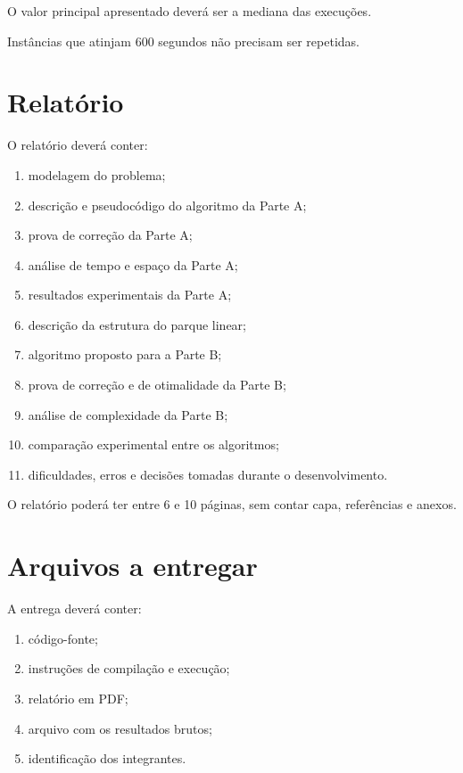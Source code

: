 \documentclass[11pt,a4paper]{article}
\begin{document}
O valor principal apresentado deverá ser a mediana das execuções.

Instâncias que atinjam 600 segundos não precisam ser repetidas.

\section{Relatório}

O relatório deverá conter:

\begin{enumerate}
    \item modelagem do problema;
    \item descrição e pseudocódigo do algoritmo da Parte A;
    \item prova de correção da Parte A;
    \item análise de tempo e espaço da Parte A;
    \item resultados experimentais da Parte A;
    \item descrição da estrutura do parque linear;
    \item algoritmo proposto para a Parte B;
    \item prova de correção e de otimalidade da Parte B;
    \item análise de complexidade da Parte B;
    \item comparação experimental entre os algoritmos;
    \item dificuldades, erros e decisões tomadas durante o desenvolvimento.
\end{enumerate}

O relatório poderá ter entre 6 e 10 páginas, sem contar capa, referências e anexos.

\section{Arquivos a entregar}

A entrega deverá conter:

\begin{enumerate}
    \item código-fonte;
    \item instruções de compilação e execução;
    \item relatório em PDF;
    \item arquivo com os resultados brutos;
    \item identificação dos integrantes.
\end{enumerate}
\end{document}
